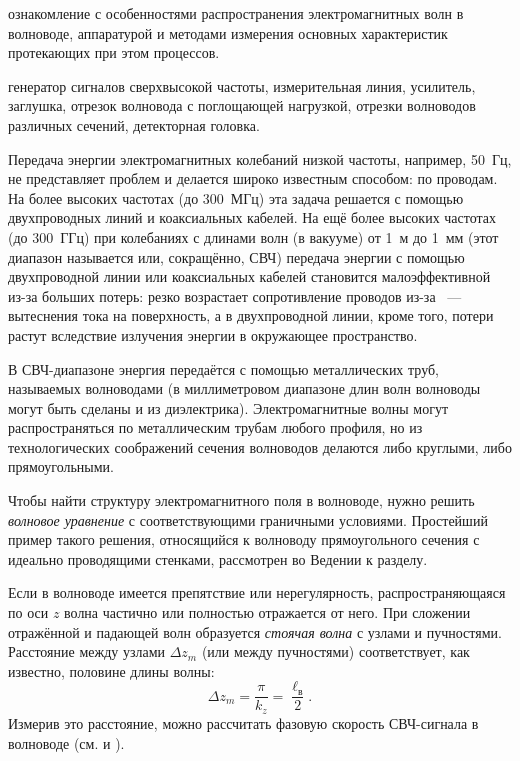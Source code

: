 
\begin{lab:aim} ознакомление с особенностями распространения
    электромагнитных волн в волноводе, аппаратурой и методами измерения основных
    характеристик протекающих при этом процессов. 
\end{lab:aim}

\begin{lab:equipment} генератор сигналов сверхвысокой частоты, измерительная
    линия, усилитель, заглушка, отрезок волновода с поглощающей нагрузкой, отрезки
    волноводов различных сечений, детекторная головка. 
\end{lab:equipment}

Передача энергии электромагнитных колебаний низкой частоты, например, 50~Гц, не
представляет проблем и делается широко известным способом: по проводам. На более
высоких частотах (до 300~МГц) эта задача решается с помощью двухпроводных линий
и коаксиальных кабелей. На ещё более высоких частотах (до 300~ГГц) при
колебаниях с длинами волн (в вакууме) от 1~м до 1~мм (этот диапазон
называется  или, сокращённо, СВЧ)
передача энергии с помощью двухпроводной линии или коаксиальных кабелей
становится малоэффективной из-за больших потерь: резко возрастает сопротивление
проводов из-за ~--- вытеснения тока на поверхность, а в
двухпроводной линии, кроме того, потери растут вследствие излучения энергии в
окружающее пространство.

В СВЧ-диапазоне энергия передаётся с помощью металлических труб, называемых
волноводами (в миллиметровом диапазоне длин волн волноводы могут быть сделаны и
из диэлектрика). Электромагнитные волны могут распространяться по металлическим
трубам любого профиля, но из технологических соображений сечения волноводов
делаются либо круглыми, либо прямоугольными.

Чтобы найти структуру электромагнитного поля в волноводе, нужно решить \emph{волновое
уравнение} с соответствующими граничными условиями. Простейший пример такого решения,
относящийся к волноводу прямоугольного сечения с идеально проводящими стенками,
рассмотрен во Ведении к разделу.

Если в волноводе имеется препятствие или нерегулярность, распространяющаяся по оси
$z$ волна частично или полностью отражается от него. При сложении 
отражённой и падающей волн образуется \emph{стоячая волна} с узлами
и пучностями. Расстояние между узлами $\Delta z_m$ (или между пучностями)
соответствует, как известно, половине длины волны:
\begin{equation}
\Delta z_m = \frac{\pi}{k_z} = \frac{\ell_{в}}{2}.
\end{equation}
Измерив это расстояние, можно рассчитать фазовую скорость 
СВЧ-сигнала в волноводе (см.  и ).


